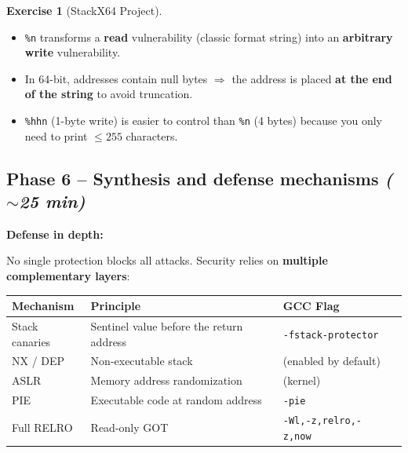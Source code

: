 \documentclass[a4paper,11pt]{article}
\theoremstyle{plain}
\theoremstyle{definition}
\newtheorem{exercice}{Exercise}
\begin{document}
\begin{exercice}[StackX64 Project]
\begin{correction}
\begin{pointcle}
\begin{itemize}
    \item \texttt{\%n} transforms a \textbf{read} vulnerability (classic format string) into an \textbf{arbitrary write} vulnerability.
    \item In 64-bit, addresses contain null bytes $\Rightarrow$ the address is placed \textbf{at the end of the string} to avoid truncation.
    \item \texttt{\%hhn} (1-byte write) is easier to control than \texttt{\%n} (4 bytes) because you only need to print $\leq 255$ characters.
\end{itemize}
\end{pointcle}

\end{correction}



\subsection*{Phase 6 -- Synthesis and defense mechanisms \hfill\normalfont\textit{($\sim$25 min)}}

\begin{rappel}
\textbf{Defense in depth:}

No single protection blocks all attacks. Security relies on \textbf{multiple complementary layers}:

\begin{center}
\begin{tabular}{llll}
\toprule
\textbf{Mechanism} & \textbf{Principle} & \textbf{GCC Flag} \\
\midrule
Stack canaries & Sentinel value before the return address & \texttt{-fstack-protector} \\
NX / DEP & Non-executable stack & (enabled by default) \\
ASLR & Memory address randomization & (kernel) \\
PIE & Executable code at random address & \texttt{-pie} \\
Full RELRO & Read-only GOT & \texttt{-Wl,-z,relro,-z,now} \\
\bottomrule
\end{tabular}
\end{center}
\end{rappel}


\end{exercice}
\end{document}
